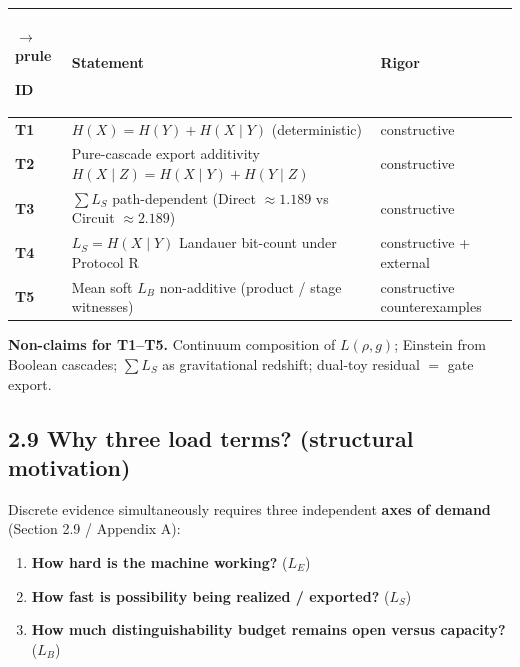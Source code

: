\documentclass[
  11pt,
]{article}
\newcounter{none} %
\providecommand{\tightlist}{%
  \setlength{\itemsep}{0pt}\setlength{\parskip}{0pt}}
\begin{document}
{\def\LTcaptype{none} %
\begin{longtable}[]{@{}
  >{\raggedright\arraybackslash}p{}
  >{\raggedright\arraybackslash}p{}
  >{\raggedright\arraybackslash}p{}@{}}
$\rightarrow$prule\noalign{}
\begin{minipage}[b]{\linewidth}\raggedright
ID
\end{minipage} & \begin{minipage}[b]{\linewidth}\raggedright
Statement
\end{minipage} & \begin{minipage}[b]{\linewidth}\raggedright
Rigor
\end{minipage} \\
\midrule\noalign{}
\endhead
\bottomrule\noalign{}
\endlastfoot
\textbf{T1} & \(H(X)=H(Y)+H(X\mid Y)\) (deterministic) & constructive \\
\textbf{T2} & Pure-cascade export additivity \(H(X\mid Z)=H(X\mid Y)+H(Y\mid Z)\) & constructive \\
\textbf{T3} & \(\sum L_S\) path-dependent (Direct \(\approx 1.189\) vs Circuit \(\approx 2.189\)) & constructive \\
\textbf{T4} & \(L_S=H(X\mid Y)\) Landauer bit-count under Protocol R & constructive + external \\
\textbf{T5} & Mean soft \(L_B\) non-additive (product / stage witnesses) & constructive counterexamples \\
\end{longtable}
}

\textbf{Non-claims for T1--T5.} Continuum composition of \(L(\rho,g)\); Einstein from Boolean cascades; \(\sum L_S\) as gravitational redshift; dual-toy residual \(=\) gate export.

\subsection{2.9 Why three load terms? (structural motivation)}\label{why-three-load-terms-structural-motivation}

Discrete evidence simultaneously requires three independent \textbf{axes of demand} (Section 2.9 / Appendix A):

\begin{enumerate}
\def\labelenumi{\arabic{enumi}.}
\tightlist
\item
  \textbf{How hard is the machine working?} (\(L_E\))\\
\item
  \textbf{How fast is possibility being realized / exported?} (\(L_S\))\\
\item
  \textbf{How much distinguishability budget remains open versus capacity?} (\(L_B\))
\end{enumerate}
\end{document}
